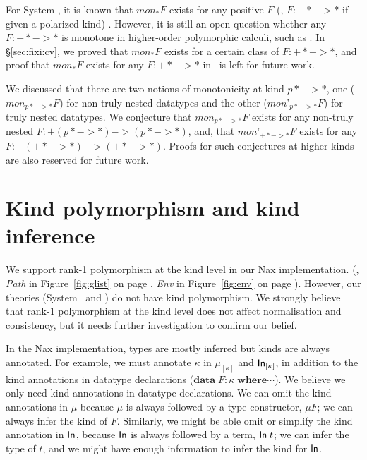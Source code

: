 For System \F, it is known that $mon_{*}F$ exists for any positive $F$
(\ie, $F:+* -> *$ if given a polarized kind) \cite{Mat99}. However,
it is still an open question whether any $F:+* -> *$ is monotone
in higher-order polymorphic calculi, such as \Fixi. In \S\ref{sec:fixi:cv},
we proved that $mon_{*}F$ exists for a certain class of $F:+* -> *$,
and proof that $mon_{*}F$ exists for any $F:+* -> *$ in \Fixi\ is
left for future work.

We discussed that there are two notions of monotonicity at kind $p* -> *$,
one ($\textit{mon}_{p* -> *}F$) for non-truly nested datatypes and
the other ($\textit{mon'}_{p* -> *}F$) for truly nested datatypes.
We conjecture that $\textit{mon}_{p* -> *}F$ exists for any non-truly nested
$F:+(p* -> *) -> (p* -> *)$, and, that $\textit{mon'}_{+* -> *}F$ exists
for any $F:+(+* -> *) -> (+* -> *)$. Proofs for such conjectures
at higher kinds are also reserved for future work.

\section{Kind polymorphism and kind inference}\label{sec:futwork:kindpoly}
We support rank-1 polymorphism at the kind level in our Nax implementation.
(\eg, \textit{Path} in Figure~\ref{fig:glist} on page \pageref{fig:glist},
      \textit{Env} in Figure~\ref{fig:env} on page \pageref{fig:env}).
However, our theories (System \Fi\ and \Fixi) do not have kind polymorphism.
We strongly believe that rank-1 polymorphism at the kind level does not affect
normalisation and consistency, but it needs further investigation to confirm
our belief.

In the Nax implementation, types are mostly inferred but kinds are always
annotated. For example, we must annotate $\kappa$ in $\mu_{[\kappa]}$ and
$\mathsf{In}_{[\kappa]}$, in addition to the kind annotations in datatype declarations
($\mathbf{data}\;F : \kappa\;\mathbf{where} \cdots$).
We believe we only need kind annotations in datatype declarations.
We can omit the kind annotations in $\mu$ because $\mu$ is always
followed by a type constructor, $\mu F$; we can always infer
the kind of $F$. Similarly, we might be able omit or simplify
the kind annotation in $\mathsf{In}$, because $\mathsf{In}$ is always followed by a term,
$\mathsf{In}\;t$; we can infer the type of $t$, and we might have
enough information to infer the kind for $\mathsf{In}$.

